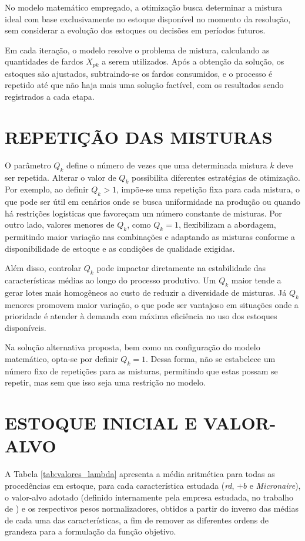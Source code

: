 \documentclass[
    12pt,                %
    openright,           %
    oneside,             %
    a4paper,             %
    english,             %
    spanish,             %
    brazil               %
]{ufscar}
\begin{document}
No modelo matemático empregado, a otimização busca determinar a mistura ideal com base exclusivamente no estoque disponível no momento da resolução, sem considerar a evolução dos estoques ou decisões em períodos futuros.

Em cada iteração, o modelo resolve o problema de mistura, calculando as quantidades de fardos \(X_{pk}\) a serem utilizados. Após a obtenção da solução, os estoques são ajustados, subtraindo-se os fardos consumidos, e o processo é repetido até que não haja mais uma solução factível, com os resultados sendo registrados a cada etapa.

\section{REPETIÇÃO DAS MISTURAS}

O parâmetro \( Q_k \) define o número de vezes que uma determinada mistura \( k \) deve ser repetida. Alterar o valor de \( Q_k \) possibilita diferentes estratégias de otimização. Por exemplo, ao definir \( Q_k > 1 \), impõe-se uma repetição fixa para cada mistura, o que pode ser útil em cenários onde se busca uniformidade na produção ou quando há restrições logísticas que favoreçam um número constante de misturas. Por outro lado, valores menores de \( Q_k \), como \( Q_k = 1 \), flexibilizam a abordagem, permitindo maior variação nas combinações e adaptando as misturas conforme a disponibilidade de estoque e as condições de qualidade exigidas.

Além disso, controlar \( Q_k \) pode impactar diretamente na estabilidade das características médias ao longo do processo produtivo. Um \( Q_k \) maior tende a gerar lotes mais homogêneos ao custo de reduzir a diversidade de misturas. Já \( Q_k \) menores promovem maior variação, o que pode ser vantajoso em situações onde a prioridade é atender à demanda com máxima eficiência no uso dos estoques disponíveis.

Na solução alternativa proposta, bem como na configuração do modelo matemático, opta-se por definir \( Q_k = 1 \). Dessa forma, não se estabelece um número fixo de repetições para as misturas, permitindo que estas possam se repetir, mas sem que isso seja uma restrição no modelo.

\section{ESTOQUE INICIAL E VALOR-ALVO}

A Tabela \ref{tab:valores_lambda} apresenta a média aritmética para todas as procedências em estoque, para cada característica estudada (\textit{rd}, \textit{\(+b\)} e \textit{Micronaire}), o valor-alvo adotado (definido internamente pela empresa estudada, no trabalho de ) e os respectivos pesos normalizadores, obtidos a partir do inverso das médias de cada uma das características, a fim de remover as diferentes ordens de grandeza para a formulação da função objetivo. 
\end{document}
